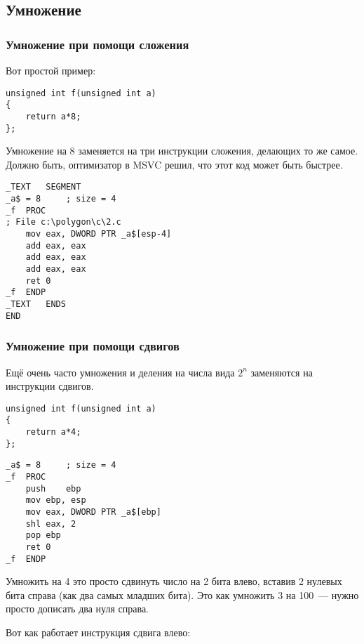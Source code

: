 ﻿\subsection{Умножение}

\subsubsection{Умножение при помощи сложения}

Вот простой пример:

\begin{lstlisting}[style=customc]
unsigned int f(unsigned int a)
{
	return a*8;
};
\end{lstlisting}

Умножение на 8 заменяется на три инструкции сложения, делающих то же самое.
Должно быть, оптимизатор в MSVC решил, что этот код может быть быстрее.

\begin{lstlisting}[caption=\Optimizing MSVC 2010,style=customasmx86]
_TEXT	SEGMENT
_a$ = 8		; size = 4
_f	PROC
; File c:\polygon\c\2.c
	mov	eax, DWORD PTR _a$[esp-4]
	add	eax, eax
	add	eax, eax
	add	eax, eax
	ret	0
_f	ENDP
_TEXT	ENDS
END
\end{lstlisting}

\subsubsection{Умножение при помощи сдвигов}
\label{subsec:mult_using_shifts}

Ещё очень часто умножения и деления на числа вида $2^{n}$ заменяются на инструкции сдвигов.

\begin{lstlisting}[style=customc]
unsigned int f(unsigned int a)
{
	return a*4;
};
\end{lstlisting}

\begin{lstlisting}[caption=\NonOptimizing MSVC 2010,style=customasmx86]
_a$ = 8		; size = 4
_f	PROC
	push	ebp
	mov	ebp, esp
	mov	eax, DWORD PTR _a$[ebp]
	shl	eax, 2
	pop	ebp
	ret	0
_f	ENDP
\end{lstlisting}

Умножить на 4 это просто сдвинуть число на 2 бита влево, 
вставив 2 нулевых бита справа (как два самых младших бита). 
Это как умножить 3 на 100~--- нужно просто дописать два нуля справа.

Вот как работает инструкция сдвига влево:



